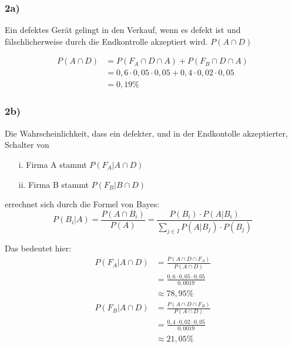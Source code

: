 \documentclass[main.tex]{subfiles}
\begin{document}
\subsubsection{2a)}
Ein defektes Gerät gelingt in den Verkauf, wenn es defekt ist und fälschlicherweise durch die Endkontrolle akzeptiert wird. $P(A\cap D)$

$$\begin{aligned}
    P(A\cap D) &= P(F_A \cap D \cap A) + P(F_B \cap D \cap A) \\
    &= 0,6 \cdot 0,05 \cdot 0,05 + 0,4 \cdot 0,02 \cdot 0,05 \\
    &= 0,19 \%
\end{aligned}$$

\subsubsection{2b)}
Die Wahrscheinlichkeit, dass ein defekter, und in der Endkontolle akzeptierter, Schalter von
\begin{enumerate}
    \item[i.] Firma A stammt $P(F_A | A\cap D)$
    \item[ii.] Firma B stammt $P(F_B | B\cap D)$
\end{enumerate}
errechnet sich durch die Formel von Bayes:
$$
    P(B_i | A) = \frac{P(A\cap B_i)}{P(A)} = \frac{P(B_i) \cdot P(A|B_i)}{\sum \limits_{j\in I} P(A|B_j)\cdot P(B_j)}
$$

Das bedeutet hier: 
$$\begin{aligned}
    P(F_A | A\cap D) &= \frac{P(A\cap D \cap F_A)}{P(A\cap D)} \\[2mm]
    &= \frac{0,6 \cdot 0,05 \cdot 0,05}{0,0019} \\[2mm]
    &\approx 78,95 \% \\[4mm]
    P(F_B | A\cap D) &= \frac{P(A\cap D \cap F_B)}{P(A\cap D)} \\[2mm]
    &= \frac{0,4 \cdot 0,02 \cdot 0,05}{0,0019} \\[2mm]
    &\approx 21,05 \% \\
\end{aligned}$$
\end{document}
